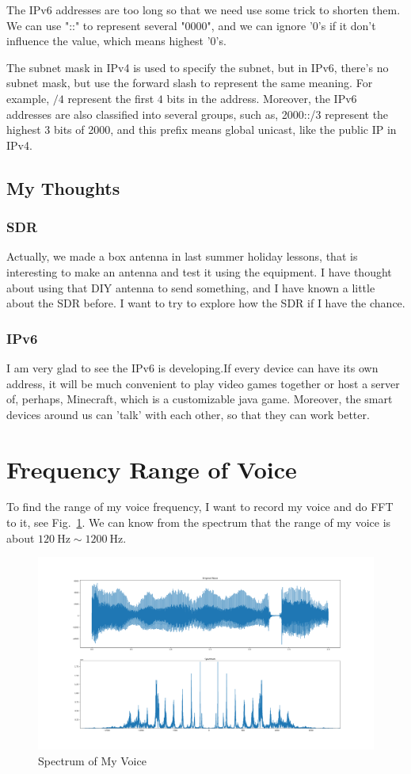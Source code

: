 \documentclass{article}
\begin{document}
The IPv6 addresses are too long so that we need use some trick to shorten them. We can use "::" to represent several "0000", and we can ignore '0's if it don't influence the value, which means highest '0's.

The subnet mask in IPv4 is used to specify the subnet, but in IPv6, there's no subnet mask, but use the forward slash to represent the same meaning. For example, $/4$ represent the first $4$ bits in the address. Moreover, the IPv6 addresses are also classified into several groups, such as, 2000::/3 represent the highest 3 bits of 2000, and this prefix means global unicast, like the public IP in IPv4.

\subsection{My Thoughts}
\subsubsection*{SDR}
Actually, we made a box antenna in last summer holiday lessons, that is interesting to make an antenna and test it using the equipment. I have thought about using that DIY antenna to send something, and I have known a little about the SDR before. I want to try to explore how the SDR if I have the chance.
\subsubsection*{IPv6}
I am very glad to see the IPv6 is developing.If every device can have its own address, it will be much convenient to play video games together or host a server of, perhaps, Minecraft, which is a customizable java game. Moreover, the smart devices around us can 'talk' with each other, so that they can work better.

\section{Frequency Range of Voice}
To find the range of my voice frequency, I want to record my voice and do FFT to it, see Fig.~\ref{fig:voiceSpectrum}. We can know from the spectrum that the range of my voice is about $120~\mathrm{Hz} \sim 1200~\mathrm{Hz}$.

\begin{figure}[!h]
	\centering
	\includegraphics[width=6 in]{../pic/voiceOri.png}
	\caption{Spectrum of My Voice}
	\label{fig:voiceSpectrum}
\end{figure}
\end{document}
